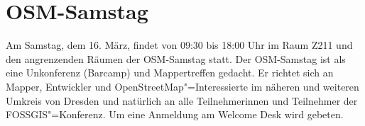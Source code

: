 \newpage
\pagestyle{cropmarksstyle}
\section*{OSM-Samstag}
\label{osm-samstag}
Am Samstag, dem 16. März, findet von 09:30 bis 18:00 Uhr im Raum Z211 und den angrenzenden Räumen der OSM-Samstag statt.
Der OSM-Samstag ist als eine Unkonferenz (Barcamp) und Mappertreffen gedacht.
Er richtet sich an Mapper, Entwickler und OpenStreetMap"=Interessierte im näheren und
weiteren Umkreis von Dresden und natürlich an alle Teilnehmerinnen und Teilnehmer der FOSSGIS"=Konferenz. Um eine Anmeldung am Welcome Desk wird gebeten.

\vspace{2\baselineskip}


